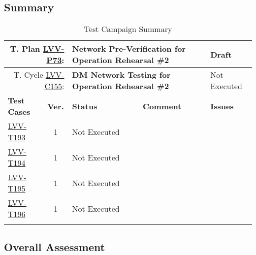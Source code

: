 \documentclass[DM,lsstdraft,STR,toc]{lsstdoc}
\begin{document}
\subsection{Summary}
\label{sect:summarytable}

{\small
\begin{longtable}{p{2cm}cp{2.3cm}p{8.6cm}p{2.3cm}}
\toprule
\multicolumn{2}{r}{ T. Plan \href{https://jira.lsstcorp.org/secure/Tests.jspa\#/testPlan/LVV-P73}{LVV-P73}:} &
\multicolumn{2}{p{10.9cm}}{\textbf{ Network Pre-Verification for Operation Rehearsal \#2 }} & Draft \\\hline
\multicolumn{2}{r}{ T. Cycle \href{https://jira.lsstcorp.org/secure/Tests.jspa\#/testCycle/LVV-C155}{LVV-C155}:} &
\multicolumn{2}{p{10.9cm}}{\textbf{ DM Network Testing for Operation Rehearsal \#2 }} & Not Executed \\\hline
\textbf{Test Cases} &  \textbf{Ver.} & \textbf{Status} & \textbf{Comment} & \textbf{Issues} \\\toprule
\href{https://jira.lsstcorp.org/secure/Tests.jspa#/testCase/LVV-T193}{LVV-T193}
&  1
& Not Executed &
\begin{minipage}[]{9cm}
\smallskip

\medskip
\end{minipage}
&
\\\hline
\href{https://jira.lsstcorp.org/secure/Tests.jspa#/testCase/LVV-T194}{LVV-T194}
&  1
& Not Executed &
\begin{minipage}[]{9cm}
\smallskip

\medskip
\end{minipage}
&
\\\hline
\href{https://jira.lsstcorp.org/secure/Tests.jspa#/testCase/LVV-T195}{LVV-T195}
&  1
& Not Executed &
\begin{minipage}[]{9cm}
\smallskip

\medskip
\end{minipage}
&
\\\hline
\href{https://jira.lsstcorp.org/secure/Tests.jspa#/testCase/LVV-T196}{LVV-T196}
&  1
& Not Executed &
\begin{minipage}[]{9cm}
\smallskip

\medskip
\end{minipage}
&
\\\hline
\caption{Test Campaign Summary}
\label{table:summary}
\end{longtable}
}

\subsection{Overall Assessment}
\label{sect:overallassessment}
\end{document}
